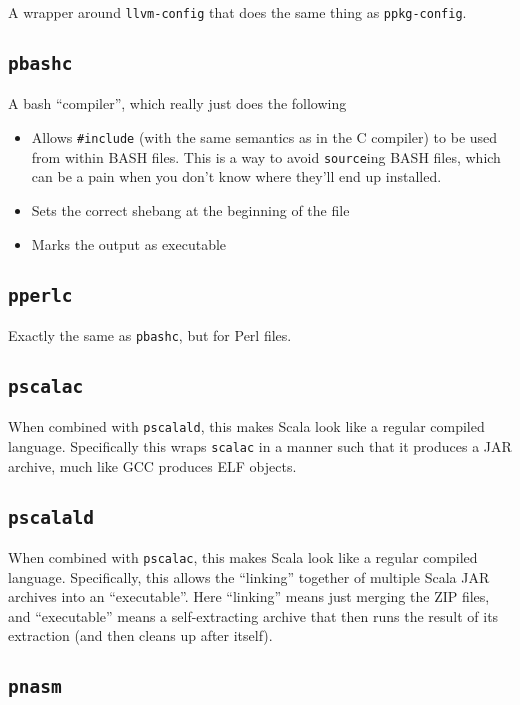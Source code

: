 \documentclass{article}
\begin{document}
A wrapper around \texttt{llvm-config} that does the same thing as
\texttt{ppkg-config}.

\subsection{\texttt{pbashc}}

A bash ``compiler'', which really just does the following
\begin{itemize}
\item Allows \texttt{\#include} (with the same semantics as in the C
  compiler) to be used from within BASH files.  This is a way to avoid
  \texttt{source}ing BASH files, which can be a pain when you don't
  know where they'll end up installed.
\item Sets the correct shebang at the beginning of the file
\item Marks the output as executable
\end{itemize}

\subsection{\texttt{pperlc}}

Exactly the same as \texttt{pbashc}, but for Perl files.

\subsection{\texttt{pscalac}}

When combined with \texttt{pscalald}, this makes Scala look like a
regular compiled language.  Specifically this wraps \texttt{scalac} in
a manner such that it produces a JAR archive, much like GCC produces
ELF objects.

\subsection{\texttt{pscalald}}

When combined with \texttt{pscalac}, this makes Scala look like a
regular compiled language.  Specifically, this allows the ``linking''
together of multiple Scala JAR archives into an ``executable''.  Here
``linking'' means just merging the ZIP files, and ``executable'' means
a self-extracting archive that then runs the result of its extraction
(and then cleans up after itself).

\subsection{\texttt{pnasm}}
\end{document}
